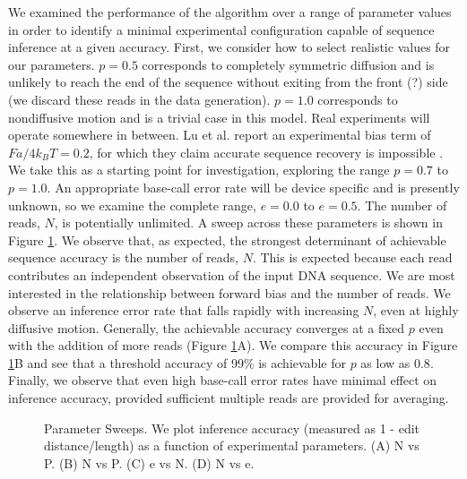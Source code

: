 \documentclass{biophys_letter}
\begin{document}
We examined the performance of the algorithm over a range of parameter values in order to identify a minimal experimental configuration capable of sequence inference at a given accuracy.
First, we consider how to select realistic values for our parameters.
$p=0.5$ corresponds to completely symmetric diffusion and is unlikely to reach the end of the sequence without exiting from the front (?) side (we discard these reads in the data generation).
$p=1.0$ corresponds to nondiffusive motion and is a trivial case in this model.
Real experiments will operate somewhere in between.
Lu et al. report an experimental bias term of $Fa/4k_{B}T=0.2$, for which they claim accurate sequence recovery is impossible \cite{Lu:2011}.
We take this as a starting point for investigation, exploring the range $p=0.7$ to $p=1.0$.
An appropriate base-call error rate will be device specific and is presently unknown, so we examine the complete range, $e=0.0$ to $e=0.5$.
The number of reads, $N$, is potentially unlimited.
A sweep across these parameters is shown in Figure \ref{fig:parameter_sweeps}.
We observe that, as expected, the strongest determinant of achievable sequence accuracy is the number of reads, $N$.
This is expected because each read contributes an independent observation of the input DNA sequence.
We are most interested in the relationship between forward bias and the number of reads.
We observe an inference error rate that falls rapidly with increasing $N$, even at highly diffusive motion. 
Generally, the achievable accuracy converges at a fixed $p$ even with the addition of more reads (Figure \ref{fig:parameter_sweeps}A).
We compare this accuracy in Figure \ref{fig:parameter_sweeps}B and see that a threshold accuracy of 99\% is achievable for $p$ as low as $0.8$.
Finally, we observe that even high base-call error rates have minimal effect on inference accuracy, provided sufficient multiple reads are provided for averaging.

\begin{figure}
\caption{Parameter Sweeps. We plot inference accuracy (measured as 1 - edit distance/length) as a function of experimental parameters. (A) N vs P. (B) N vs P. (C) e vs N. (D) N vs e.}
\label{fig:parameter_sweeps}
\end{figure}
\end{document}
